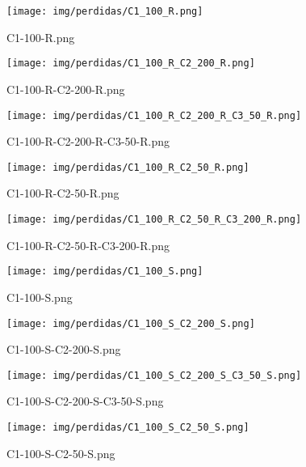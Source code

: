 \begin{figure}[H]
    \centerline{\texttt{[image: img/perdidas/C1\_100\_R.png]}}
    \caption{C1-100-R.png}
    \label{fig:C1_100_R.png}
\end{figure}

\begin{figure}[H]
    \centerline{\texttt{[image: img/perdidas/C1\_100\_R\_C2\_200\_R.png]}}
    \caption{C1-100-R-C2-200-R.png}
    \label{fig:C1_100_R_C2_200_R.png}
\end{figure}

\begin{figure}[H]
    \centerline{\texttt{[image: img/perdidas/C1\_100\_R\_C2\_200\_R\_C3\_50\_R.png]}}
    \caption{C1-100-R-C2-200-R-C3-50-R.png}
    \label{fig:C1_100_R_C2_200_R_C3_50_R.png}
\end{figure}

\begin{figure}[H]
    \centerline{\texttt{[image: img/perdidas/C1\_100\_R\_C2\_50\_R.png]}}
    \caption{C1-100-R-C2-50-R.png}
    \label{fig:C1_100_R_C2_50_R.png}
\end{figure}

\begin{figure}[H]
    \centerline{\texttt{[image: img/perdidas/C1\_100\_R\_C2\_50\_R\_C3\_200\_R.png]}}
    \caption{C1-100-R-C2-50-R-C3-200-R.png}
    \label{fig:C1_100_R_C2_50_R_C3_200_R.png}
\end{figure}

\begin{figure}[H]
    \centerline{\texttt{[image: img/perdidas/C1\_100\_S.png]}}
    \caption{C1-100-S.png}
    \label{fig:C1_100_S.png}
\end{figure}

\begin{figure}[H]
    \centerline{\texttt{[image: img/perdidas/C1\_100\_S\_C2\_200\_S.png]}}
    \caption{C1-100-S-C2-200-S.png}
    \label{fig:C1_100_S_C2_200_S.png}
\end{figure}

\begin{figure}[H]
    \centerline{\texttt{[image: img/perdidas/C1\_100\_S\_C2\_200\_S\_C3\_50\_S.png]}}
    \caption{C1-100-S-C2-200-S-C3-50-S.png}
    \label{fig:C1_100_S_C2_200_S_C3_50_S.png}
\end{figure}

\begin{figure}[H]
    \centerline{\texttt{[image: img/perdidas/C1\_100\_S\_C2\_50\_S.png]}}
    \caption{C1-100-S-C2-50-S.png}
    \label{fig:C1_100_S_C2_50_S.png}
\end{figure}

